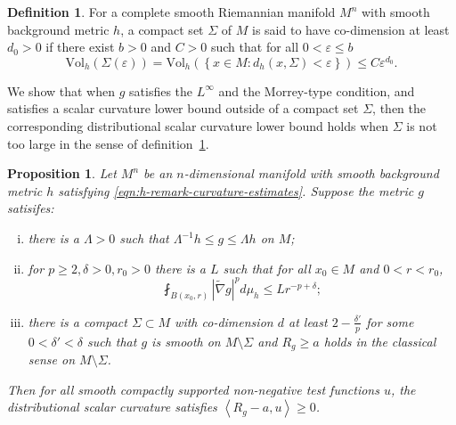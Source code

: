 \documentclass[12pt]{amsart}
\theoremstyle{plain}
\theoremstyle{plain}
\newtheorem{proposition}[subsection]{Proposition}
\theoremstyle{definition}
\newtheorem{definition}[subsection]{Definition}
\theoremstyle{remark}
\numberwithin{equation}{subsection}
\newcommand{\hdel}{\tilde{\nabla}}
\begin{document}
\begin{definition}
\label{defn:codim}
For a complete smooth Riemannian manifold $M^n$ with smooth background metric $h$, a compact set $\Sigma$ of $M$ is said to have co-dimension at least $d_0 > 0$ if there exist $b > 0$ and $C > 0$ such that for all $0 < \varepsilon \leq b$
\begin{equation*}
    \text{Vol}_h\left(\Sigma(\varepsilon)\right) = \text{Vol}_h\left(\left\{x \in M : d_h(x,\Sigma) < \varepsilon\right\}\right) \leq C\varepsilon^{d_0}.
\end{equation*}
    
\end{definition}

We show that when $g$ satisfies the $L^\infty$ and the Morrey-type condition, and satisfies a scalar curvature lower bound outside of a compact set $\Sigma$, then the corresponding distributional scalar curvature lower bound holds when $\Sigma$ is not too large in the sense of definition~\ref{defn:codim}.

\begin{proposition}
\label{prop:distributional-scalar-curvature}
    Let $M^n$ be an $n$-dimensional manifold with smooth background metric $h$ satisfying \eqref{eqn:h-remark-curvature-estimates}. Suppose the metric $g$ satisifes:
    \begin{enumerate}[(i)]
        \item there is a $\Lambda > 0$ such that $\Lambda^{-1}h \leq g \leq \Lambda h$ on $M$;
        \item for $p \geq 2, \delta > 0, r_0 > 0$ there is a $L$ such that for all $x_0 \in M$ and $0 < r < r_0$,
        \begin{equation}
            \fint_{B(x_0, r)} |\hdel g|^p d\mu_h \leq L r^{-p + \delta};
        \end{equation}
        \item there is a compact $\Sigma \subset M$ with co-dimension $d$ at least $2 - \frac{\delta'}{p}$ for some $0<\delta'<\delta$ such that $g$ is smooth on $M \setminus \Sigma$ and $R_g \geq a$ holds in the classical sense on $M \setminus \Sigma$.
    \end{enumerate}
    Then for all smooth compactly supported non-negative test functions $u$, the distributional scalar curvature satisfies $\left\langle R_g - a, u \right\rangle \geq 0$.

\end{proposition}
\end{document}
